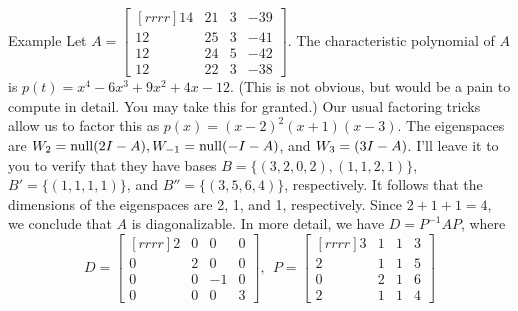 \begin{frame}{Example}
Let $A=\begin{bmatrix}[rrrr]
14 & 21 & 3 & -39 \\
12 & 25 & 3 & -41 \\
12 & 24 & 5 & -42 \\
12 & 22 & 3 & -38
\end{bmatrix}$.  
\bpause
The characteristic polynomial of $A$ is $p(t)=x^4 - 6x^3 + 9x^2 + 4x - 12$. (This is not obvious, but would be a pain to compute in detail. You may take this for granted.) 
\bpause
Our usual factoring tricks allow us to factor this as $p(x)=(x-2)^2(x+1)(x-3)$. 
\bpause
The eigenspaces are $W_2=\operatorname{null}(2I-A), W_{-1}=\operatorname{null}(-I-A)$, and $W_3=\null(3I-A)$. I'll leave it to you to verify that they have bases $B=\{ (3,2,0,2), (1,1,2,1)\}$, $B'=\{(1,1,1,1)\}$, and $B''=\{(3,5,6,4)\}$, respectively. 
\bpause
It follows that the dimensions of the eigenspaces are 2, 1, and 1, respectively. Since $2+1+1=4$, we conclude that $A$ is diagonalizable. 
\bpause
In more detail, we have $D=P^{-1}AP$, where 
\[
D=\begin{bmatrix}[rrrr]
2&0&0&0\\
0&2&0&0\\
0&0&-1&0\\
0&0&0&3
\end{bmatrix}, \ \
P=\begin{bmatrix}[rrrr]
3 & 1 & 1 & 3 \\
2 & 1 & 1 & 5 \\
0 & 2 & 1 & 6 \\
2 & 1 & 1 & 4
\end{bmatrix}
\]
\end{frame}

